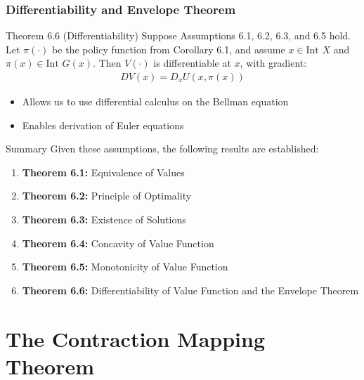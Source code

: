 \documentclass[9pt,aspectratio=169]{beamer}
\begin{document}
\begin{frame}
\frametitle{Differentiability and Envelope Theorem}

\begin{block}{Theorem 6.6 (Differentiability)}
    Suppose Assumptions 6.1, 6.2, 6.3, and 6.5 hold. Let $\pi(\cdot)$ be the
    policy function from Corollary 6.1, and assume $x \in \text{Int }X$ and
    $\pi(x) \in \text{Int }G(x)$. Then $V(\cdot)$ is differentiable at $x$,
    with gradient:
    \begin{align*}
        DV(x) = D_x U(x, \pi(x))
    \end{align*}
\end{block}

\begin{itemize}
    \item Allows us to use differential calculus on the Bellman equation
    \item Enables derivation of Euler equations
\end{itemize}

\end{frame}

\begin{frame}{Summary}
    Given these assumptions, the following results are established:
    \begin{enumerate}
        \item \textbf{Theorem 6.1:} Equivalence of Values
        \item \textbf{Theorem 6.2:} Principle of Optimality  
        \item \textbf{Theorem 6.3:} Existence of Solutions
        \item \textbf{Theorem 6.4:} Concavity of Value Function
        \item \textbf{Theorem 6.5:} Monotonicity of Value Function
        \item \textbf{Theorem 6.6:} Differentiability of Value Function and
        the Envelope Theorem
    \end{enumerate}
\end{frame}

\section{The Contraction Mapping Theorem}
\end{document}
